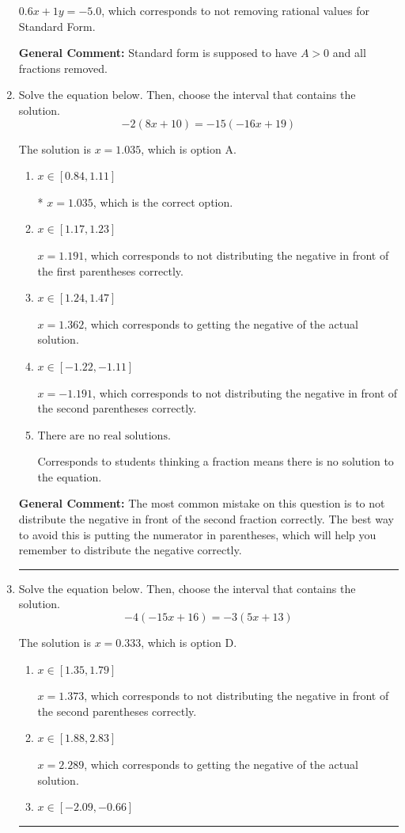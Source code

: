 \documentclass{extbook}[14pt]
\newcommand{\litem}[1]{\item #1

\rule{\textwidth}{0.4pt}}
\begin{document}
\begin{enumerate}
{\begin{enumerate}[label=\Alph*.]
 $0.6x + 1y = -5.0$, which corresponds to not removing rational values for Standard Form.
\end{enumerate}

\textbf{General Comment:} Standard form is supposed to have $A > 0$ and all fractions removed.
}
\litem{
Solve the equation below. Then, choose the interval that contains the solution.
\[ -2(8x + 10) = -15(-16x + 19) \]

The solution is \( x = 1.035 \), which is option A.\begin{enumerate}[label=\Alph*.]
\item \( x \in [0.84, 1.11] \)

* $x = 1.035$, which is the correct option.
\item \( x \in [1.17, 1.23] \)

$x = 1.191$, which corresponds to not distributing the negative in front of the first parentheses correctly.
\item \( x \in [1.24, 1.47] \)

$x = 1.362$, which corresponds to getting the negative of the actual solution.
\item \( x \in [-1.22, -1.11] \)

$x = -1.191$, which corresponds to not distributing the negative in front of the second parentheses correctly.
\item \( \text{There are no real solutions.} \)

Corresponds to students thinking a fraction means there is no solution to the equation.
\end{enumerate}

\textbf{General Comment:} The most common mistake on this question is to not distribute the negative in front of the second fraction correctly. The best way to avoid this is putting the numerator in parentheses, which will help you remember to distribute the negative correctly.
}
\litem{
Solve the equation below. Then, choose the interval that contains the solution.
\[ -4(-15x + 16) = -3(5x + 13) \]

The solution is \( x = 0.333 \), which is option D.\begin{enumerate}[label=\Alph*.]
\item \( x \in [1.35, 1.79] \)

$x = 1.373$, which corresponds to not distributing the negative in front of the second parentheses correctly.
\item \( x \in [1.88, 2.83] \)

$x = 2.289$, which corresponds to getting the negative of the actual solution.
\item \( x \in [-2.09, -0.66] \)


\end{enumerate}}
\end{enumerate}
\end{document}
